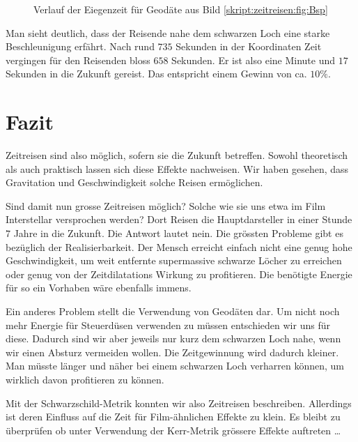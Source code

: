 \begin{refsection}
\begin{figure}
        \caption{Verlauf der Eiegenzeit für Geodäte aus Bild \ref{skript:zeitreisen:fig:Bsp} }
        \label{skript:zeitreisen:fig:Bsp_time} 
    \end{figure}
    Man sieht deutlich, dass der Reisende nahe dem schwarzen Loch eine starke Beschleunigung erfährt. Nach rund $735$ Sekunden in der Koordinaten Zeit vergingen für den Reisenden bloss $658$ Sekunden. Er ist also eine Minute und $17$ Sekunden in die Zukunft gereist. Das entspricht einem Gewinn von ca. $10\%$.
    
   	\section{Fazit}
    
    Zeitreisen sind also möglich, sofern sie die Zukunft betreffen. Sowohl theoretisch als auch praktisch lassen sich diese Effekte nachweisen. Wir haben gesehen, dass Gravitation und Geschwindigkeit solche Reisen ermöglichen.
    
    Sind damit nun grosse Zeitreisen möglich? Solche wie sie uns etwa im Film Interstellar versprochen werden? Dort Reisen die Hauptdarsteller in einer Stunde $7$ Jahre in die Zukunft. Die Antwort lautet nein. Die grössten Probleme gibt es bezüglich der Realisierbarkeit. Der Mensch erreicht einfach nicht eine genug hohe Geschwindigkeit, um weit entfernte supermassive schwarze Löcher zu erreichen oder genug von der Zeitdilatations Wirkung zu profitieren. Die benötigte Energie für so ein Vorhaben wäre ebenfalls immens.
    
    Ein anderes Problem stellt die Verwendung von Geodäten dar. Um nicht noch mehr Energie für Steuerdüsen verwenden zu müssen entschieden wir uns für diese. Dadurch sind wir aber jeweils nur kurz dem schwarzen Loch nahe, wenn wir einen Absturz vermeiden wollen. Die Zeitgewinnung wird dadurch kleiner. Man müsste länger und näher bei einem schwarzen Loch verharren können, um wirklich davon profitieren zu können. 
    
    Mit der Schwarzschild-Metrik konnten wir also Zeitreisen beschreiben. Allerdings ist deren Einfluss auf die Zeit für Film-ähnlichen Effekte zu klein. Es bleibt zu überprüfen ob unter Verwendung der Kerr-Metrik grössere Effekte auftreten \dots
        
	\printbibliography[heading=subbibliography]
	\end{refsection}

